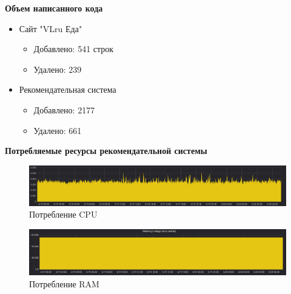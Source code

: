 \textbf{Объем написанного кода}

\begin{itemize}
  \item Сайт "VLru Еда"
    \begin{itemize}
      \item Добавлено: 541 строк
      \item Удалено: 239
    \end{itemize}
  \item Рекомендательная система
    \begin{itemize}
      \item Добавлено: 2177
      \item Удалено: 661
    \end{itemize}
\end{itemize}

\textbf{Потребляемые ресурсы рекомендательной системы}

\begin{figure}[H]
    \centering
    \includegraphics[scale=0.3]{images/cpu_usage.png}
    \caption{Потребление CPU}
\end{figure}

\begin{figure}[H]
    \centering
    \includegraphics[scale=0.3]{images/ram_usage.png}
    \caption{Потребление RAM}
\end{figure}
